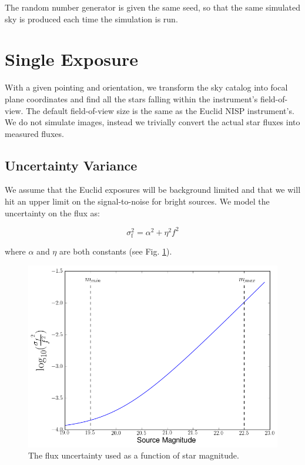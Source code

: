 \documentclass[12pt,a4paper,twoside]{article}
\begin{document}
The random number generator is given the same seed, so that the same simulated sky is produced each time the simulation is run.

\section{Single Exposure}
With a given pointing and orientation, we transform the sky catalog into focal plane coordinates and find all the stars falling within the instrument's field-of-view. The default field-of-view size is the same as the Euclid NISP instrument's. We do not simulate images, instead we trivially convert the actual star fluxes into measured fluxes. 

\subsection{Uncertainty Variance}
We assume that the Euclid exposures will be background limited and that we will hit an upper limit on the signal-to-noise for bright sources. We model the uncertainty on the flux as:

\begin{equation}
\sigma_{\text{f}}^{2} = \alpha^{2} + \eta^{2} f^{2} 
\end{equation}

\noindent{}where $\alpha$ and $\eta$ are both constants (see Fig. \ref{fig:flux_uncertainty}).

\begin{figure}[ht]
\begin{center}
\includegraphics[width=\textwidth]{flux_uncertainty_variance.png}
\end{center}
\caption{The flux uncertainty used as a function of star magnitude.\label{fig:flux_uncertainty}}
\end{figure}
\end{document}
